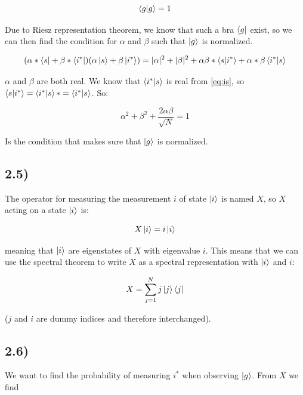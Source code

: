 \documentclass[a4paper,norsk, 10pt]{article}
\begin{document}
\begin{equation}
\braket{g}{g} = 1
\end{equation}

Due to Riesz representation theorem, we know that such a bra $\bra{g}$ exist, so we can then find the condition for $\alpha$ and $\beta$ such that $\ket{g}$ is normalized.

\begin{equation}
(\alpha* \bra{s} + \beta*\bra{i^*})(\alpha \ket{s} + \beta\ket{i^*}) = |\alpha|^2 + |\beta|^2 + \alpha\beta* \braket{s}{i^*} + \alpha*\beta \braket{i^*}{s}
\end{equation}

$\alpha$ and $\beta$ are both real. We know that $\braket{i^*}{s}$ is real from \eqref{eq:is}, so $\braket{s}{i^*} = \braket{i^*}{s}* = \braket{i^*}{s}$. So: 

\begin{equation}
\alpha^2 + \beta^2 + \frac{2\alpha \beta}{\sqrt{N}} = 1
\end{equation}\label{eq:conditionAB}

Is the condition that makes sure that $\ket{g}$ is normalized.

\subsection{2.5)}

The operator for measuring the measurement $i$ of state $\ket{i}$ is named $X$, so $X$ acting on a state $\ket{i}$ is:

\begin{equation}
X\ket{i} = i\ket{i}
\end{equation}

meaning that $\ket{i}$ are eigenstates of $X$ with eigenvalue $i$. This means that we can use the spectral theorem to write $X$ as a spectral representation with $\ket{i}$ and $i$:

\begin{equation}
X = \sum_{j=1}^N j\ket{j}\bra{j}
\end{equation}

($j$ and $i$ are dummy indices and therefore interchanged).

\subsection{2.6)}

We want to find the probability of measuring $i^*$ when observing $\ket{g}$. From $X$ we find
\end{document}
